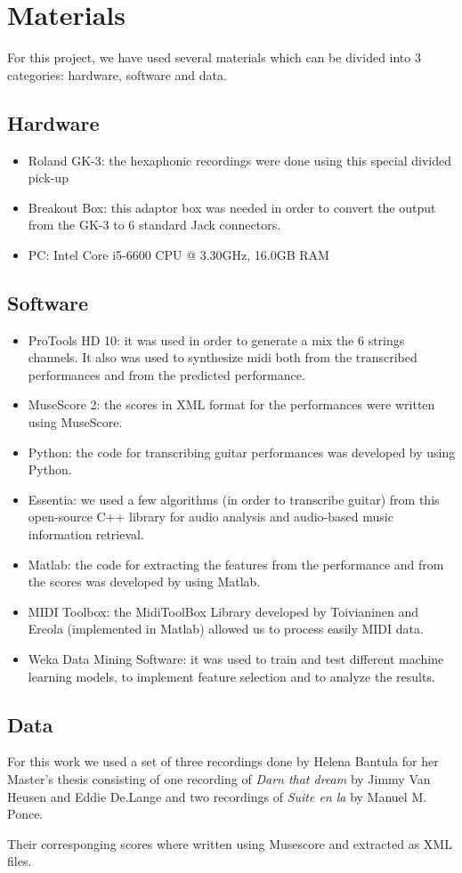 \chapter{Materials}
\label{chap:materials}
For this project, we have used several materials which can be divided into 3 categories: hardware, software and data.

\section*{Hardware}
\begin{itemize}[noitemsep]
\item Roland GK-3: the hexaphonic recordings were done using this special divided pick-up
\item Breakout Box: this adaptor box was needed in order to convert the output from the GK-3 to 6 standard Jack connectors.
\item PC: Intel Core i5-6600 CPU @ 3.30GHz, 16.0GB RAM
\end{itemize}

\section*{Software}
\begin{itemize}[noitemsep]
\item ProTools HD 10: it was used in order to generate a mix the 6 strings channels. It also was used to synthesize midi both from the transcribed performances and from the predicted performance.
\item MuseScore 2: the scores in XML format for the performances were written using MuseScore.
\item Python: the code for transcribing guitar performances was developed by using Python.
\item Essentia: we used a few algorithms (in order to transcribe guitar) from this open-source C++ library for audio analysis and audio-based music information retrieval.
\item Matlab: the code for extracting the features from the performance and from the scores was developed by using Matlab.
\item MIDI Toolbox: the MidiToolBox Library developed by Toivianinen and Ereola (implemented in Matlab) allowed us to process easily MIDI data.
\item Weka Data Mining Software: it was used to train and test different machine learning models, to implement feature selection and to analyze the results.
\end{itemize}

\section*{Data}
For this work we used a set of three recordings done by Helena Bantula for her Master's thesis consisting of one recording of \textit{Darn that dream} by Jimmy Van Heusen and Eddie De.Lange and two recordings of \textit{Suite en la} by Manuel M. Ponce.

Their corresponging scores where written using Musescore and extracted as XML files.

\cleardoublepage